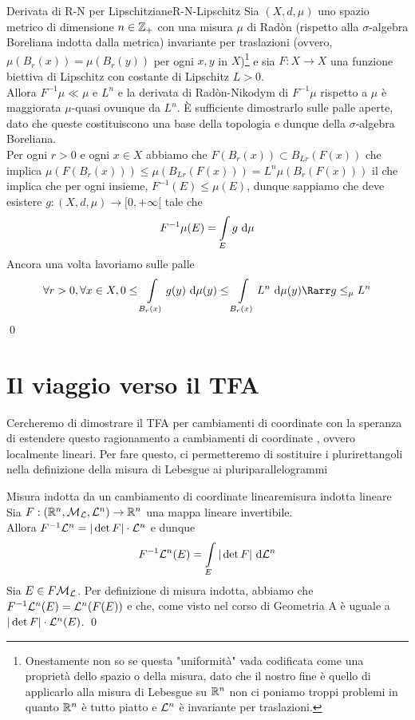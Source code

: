 \documentclass{article}
\begin{document}
\begin{proposition}{Derivata di R-N per Lipschitziane}{R-N-Lipschitz}
    Sia $(X,d,\mu)$ uno spazio metrico di dimensione $n \in \mathbb{Z}_+$ con una misura $\mu$ di Radòn (rispetto alla $\sigma$-algebra Boreliana indotta dalla metrica) invariante per traslazioni (ovvero, $\mu(B_r(x)) = \mu(B_r(y))$ per ogni $x,y$ in $X$)\footnote{Onestamente non so se questa "uniformità" vada codificata come una proprietà dello spazio o della misura, dato che il nostro fine è quello di applicarlo alla misura di Lebesgue su $\mathbb{R}^n$ non ci poniamo troppi problemi in quanto $\mathbb{R}^n$ è tutto piatto e $\mathcal{L}^n$ è invariante per traslazioni.} e sia $F:X \to X$ una funzione biettiva di Lipschitz con costante di Lipschitz $L>0$.\\
    Allora $F^{-1}\mu \ll \mu$ e $L^n$ e la derivata di Radòn-Nikodym di $F^{-1}\mu$ rispetto a $\mu$ è maggiorata $\mu$-quasi ovunque da $L^n$.
    \proof
    È sufficiente dimostrarlo sulle palle aperte, dato che queste costituiscono una base della topologia e dunque della $\sigma$-algebra Boreliana.\\
    Per ogni $r>0$ e ogni $x \in X$ abbiamo che  $F(B_r(x)) \subset B_{Lr}(F(x))$ che implica $\mu(F(B_r(x)))\le \mu(B_{Lr}(F(x))) = L^n\mu(B_r(F(x)))$ il che implica che per ogni insieme, $F^{-1}(E) \le \mu(E)$, dunque sappiamo che deve esistere $g: (X,d,\mu)\to [0,+\infty[$ tale che
    \[F^{-1}\mu(E) = \intop_E g \de \mu\]
    Ancora una volta lavoriamo sulle palle
    \[\forall r>0,\forall x \in X, 0\le \intop_{B_r(x)} g(y)\de \mu(y) \le \intop_{B_r(x)} L^n \de\mu(y) \Rarr g \le_\mu L^n \]
    \qed
\end{proposition}

\pagebreak
\section{Il viaggio verso il TFA}

Cercheremo di dimostrare il TFA per cambiamenti di coordinate  con la speranza di estendere questo ragionamento a cambiamenti di coordinate , ovvero localmente lineari. Per fare questo, ci permetteremo di sostituire i plurirettangoli nella definizione della misura di Lebesgue ai pluriparallelogrammi

\begin{lemma}{Misura indotta da un cambiamento di coordinate lineare}{misura indotta lineare}
    Sia $F: (\mathbb{R}^n, \mathcal{M}_{\mathcal{L}}, \mathcal{L}^n) \to \mathbb{R}^n$ una mappa lineare invertibile.\\
    Allora $F^{-1}\mathcal{L}^n = |\det F|\cdot \mathcal{L}^n$ e dunque
    \[F^{-1}\L^n(E) = \intop_E |\det F|\de \L^n\]
    \proof
    Sia $E \in F\mathcal{M}_{\mathcal{L}}$. Per definizione di misura indotta, abbiamo che $F^{-1}\mathcal{L}^n(E) = \mathcal{L}^n(F(E))$ e che, come visto nel corso di Geometria A è uguale a $|\det F|\cdot \mathcal{L}^n(E)$.
    \qed
\end{lemma}
\end{document}
